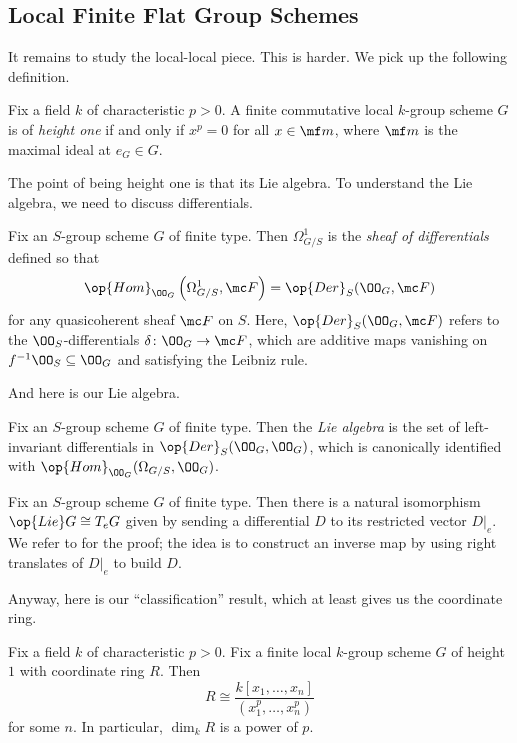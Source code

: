 \documentclass[../notes.tex]{subfiles}
\begin{document}
\subsection{Local Finite Flat Group Schemes}
It remains to study the local-local piece. This is harder. We pick up the following definition.
\begin{definition}
	Fix a field $k$ of characteristic $p>0$. A finite commutative local $k$-group scheme $G$ is of \textit{height one} if and only if $x^p=0$ for all $x\in\mf m$, where $\mf m$ is the maximal ideal at $e_G\in G$.
\end{definition}
The point of being height one is that its Lie algebra. To understand the Lie algebra, we need to discuss differentials.
\begin{definition}[differential]
	Fix an $S$-group scheme $G$ of finite type. Then $\Omega^1_{G/S}$ is the \textit{sheaf of differentials} defined so that
	\[\op{Hom}_{\OO_G}\left(\Omega^1_{G/S},\mc F\right)=\op{Der}_S(\OO_G,\mc F)\]
	for any quasicoherent sheaf $\mc F$ on $S$. Here, $\op{Der}_S(\OO_G,\mc F)$ refers to the $\OO_S$-differentials $\delta\colon\OO_G\to\mc F$, which are additive maps vanishing on $f^{-1}\OO_S\subseteq\OO_G$ and satisfying the Leibniz rule.
\end{definition}
And here is our Lie algebra.
\begin{definition}
	Fix an $S$-group scheme $G$ of finite type. Then the \textit{Lie algebra} is the set of left-invariant differentials in $\op{Der}_S(\OO_G,\OO_G)$, which is canonically identified with $\op{Hom}_{\OO_G}(\Omega_{G/S},\OO_G)$.
\end{definition}
\begin{remark}
	Fix an $S$-group scheme $G$ of finite type. Then there is a natural isomorphism $\op{Lie}G\cong T_eG$ given by sending a differential $D$ to its restricted vector $D|_e$. We refer to \cite[pp.~92--94]{mumford} for the proof; the idea is to construct an inverse map by using right translates of $D|_e$ to build $D$.
\end{remark}
Anyway, here is our ``classification'' result, which at least gives us the coordinate ring.
\begin{lemma}
	Fix a field $k$ of characteristic $p>0$. Fix a finite local $k$-group scheme $G$ of height $1$ with coordinate ring $R$. Then
	\[R\cong\frac{k[x_1,\ldots,x_n]}{\left(x_1^p,\ldots,x_n^p\right)}\]
	for some $n$. In particular, $\dim_kR$ is a power of $p$.
\end{lemma}
\end{document}
